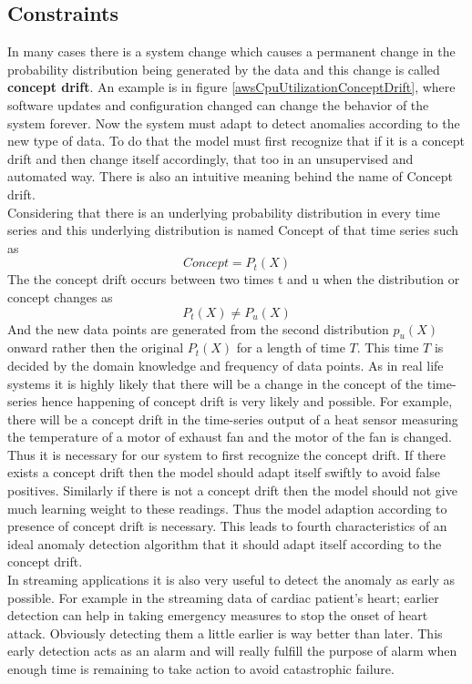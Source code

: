 \documentclass[12pt]{article}
\begin{document}
\subsection{Constraints}
In many cases there is a system change which causes a permanent change in the probability distribution being generated by the data and this change is called \textbf{concept drift}. An example is in figure \ref{awsCpuUtilizationConceptDrift}, where software updates and configuration changed can change the behavior of the system forever. Now the system must adapt to detect anomalies according to the new type of data. To do that the model must first recognize that if it is a concept drift and then change itself accordingly, that too in an unsupervised and automated way. There is also an intuitive meaning behind the name of Concept drift.\\
\break
Considering that there is an underlying probability distribution in every time series and this underlying distribution is named Concept of that time series such as
\begin{equation}
Concept =  P_t(X)
\end{equation} 
The the concept drift occurs between two times t and u when the distribution or concept changes as
\begin{equation}
    P_t(X) \neq P_u(X)
\end{equation}
And the new data points are generated from the second distribution $p_u(X)$ onward rather then the original $P_t(X)$ for a length of time $T$. This time $T$ is decided by the domain knowledge and frequency of data points.
As in real life systems it is highly likely that there will be a change in the concept of the time-series hence happening of concept drift is very likely and possible. For example, there will be a concept drift in the time-series output of a heat sensor measuring the temperature of a motor of exhaust fan and the motor of the fan is changed. Thus it is necessary for our system to first recognize the concept drift. If there exists a concept drift then the model should adapt itself swiftly to avoid false positives. Similarly if there is not a concept drift then the model should not give much learning weight to these readings. Thus the model adaption according to presence of concept drift is necessary. This leads to fourth characteristics of an ideal anomaly detection algorithm that it should adapt itself according to the concept drift.\\
\break
In streaming applications it is also very useful to detect the anomaly as early as possible. For example in the streaming data of cardiac patient's heart; earlier detection can help in taking emergency measures to stop the onset of heart attack. Obviously detecting them a little earlier is way better than later. This early detection acts as an alarm and will really fulfill the purpose of alarm when enough time is remaining to take action to avoid catastrophic failure.
\end{document}
